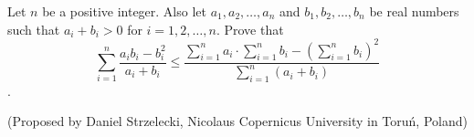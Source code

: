 Let $n$ be a positive integer. Also let $a_1, a_2, \dots, a_n$ and $b_1,b_2,\dots, b_n$ be real numbers such that $a_i+b_i>0$ for $i=1,2,\dots, n$. Prove that
$$\sum_{i=1}^n \frac{a_ib_i-b_i^2}{a_i+b_i}\le\frac{\displaystyle \sum_{i=1}^n a_i\cdot \sum_{i=1}^n b_i - \left( \sum_{i=1}^n b_i\right) ^2}{\displaystyle\sum_{i=1}^n (a_i+b_i)}$$.

(Proposed by Daniel Strzelecki, Nicolaus Copernicus University in Toruń, Poland)
